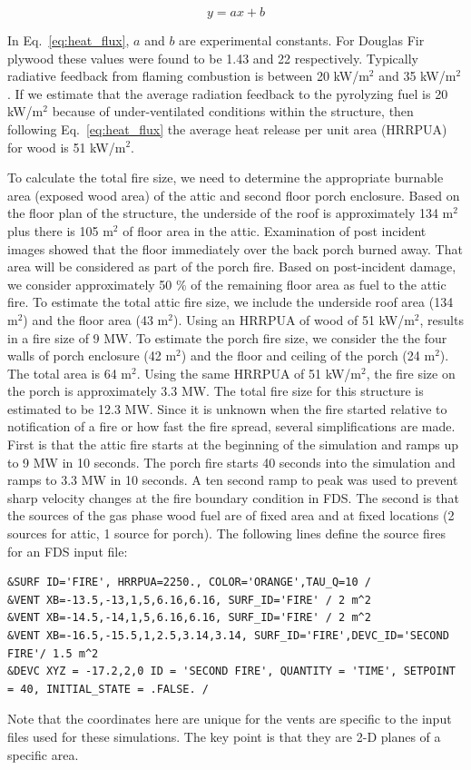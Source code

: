 \documentclass[11pt,oneside]{book}
\begin{document}
\begin{equation}
y = ax+b
\label{eq:heat_flux}
\end{equation}

In Eq.~\ref{eq:heat_flux}, $a$ and $b$ are experimental constants. For Douglas Fir plywood these values were found to be 1.43 and 22 respectively. Typically radiative feedback from flaming combustion is between 20 kW/m$^2$ and 35 kW/m$^2$ \cite{tsaidrysdale}. If we estimate that the average radiation feedback to the pyrolyzing fuel is 20 kW/m$^2$ because of under-ventilated conditions within the structure, then following Eq.~\ref{eq:heat_flux} the average heat release per unit area (HRRPUA) for wood is 51 kW/m$^2$.

To calculate the total fire size, we need to determine the appropriate burnable area (exposed wood area) of the attic and second floor porch enclosure. Based on the floor plan of the structure, the underside of the roof is approximately 134 m$^2$ plus there is 105 m$^2$ of floor area in the attic. Examination of post incident images showed that the floor immediately over the back porch burned away. That area will be considered as part of the porch fire. Based on post-incident damage, we consider approximately 50 \% of the remaining floor area as fuel to the attic fire. To estimate the total attic fire size, we include the underside roof area (134 m$^2$) and the floor area (43 m$^2$). Using an HRRPUA of wood of 51 kW/m$^2$, results in a fire size of 9 MW. To estimate the porch fire size, we consider the the four walls of porch enclosure (42 m$^2$) and the floor and ceiling of the porch (24 m$^2$). The total area is 64 m$^2$. Using the same HRRPUA of 51 kW/m$^2$, the fire size on the porch is approximately 3.3 MW. The total fire size for this structure is estimated to be 12.3 MW. Since it is unknown when the fire started relative to notification of a fire or how fast the fire spread, several simplifications are made. First is that the attic fire starts at the beginning of the simulation and ramps up to 9 MW in 10 seconds. The porch fire starts 40 seconds into the simulation and ramps to 3.3 MW in 10 seconds. A ten second ramp to peak was used to prevent sharp velocity changes at the fire boundary condition in FDS. The second is that the sources of the gas phase wood fuel are of fixed area and at fixed locations (2 sources for attic, 1 source for porch). The following lines define the source fires for an FDS input file:

\begin{lstlisting}
&SURF ID='FIRE', HRRPUA=2250., COLOR='ORANGE',TAU_Q=10 /
&VENT XB=-13.5,-13,1,5,6.16,6.16, SURF_ID='FIRE' / 2 m^2
&VENT XB=-14.5,-14,1,5,6.16,6.16, SURF_ID='FIRE' / 2 m^2
&VENT XB=-16.5,-15.5,1,2.5,3.14,3.14, SURF_ID='FIRE',DEVC_ID='SECOND FIRE'/ 1.5 m^2
&DEVC XYZ = -17.2,2,0 ID = 'SECOND FIRE', QUANTITY = 'TIME', SETPOINT = 40, INITIAL_STATE = .FALSE. /
\end{lstlisting}
Note that the coordinates here are unique for the vents are specific to the input files used for these simulations. The key point is that they are 2-D planes of a specific area.
\end{document}
